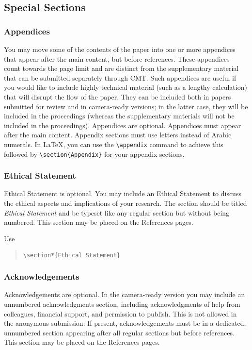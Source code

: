 \documentclass{article}
\begin{document}
\subsection{Special Sections}

\subsubsection{Appendices}
You may move some of the contents of the paper into one or more appendices that appear after the main content, but before references. These appendices count towards the page limit and are distinct from the supplementary material that can be submitted separately through CMT. Such appendices are useful if you would like to include highly technical material (such as a lengthy calculation) that will disrupt the flow of the paper. They can be included both in papers submitted for review and in camera-ready versions; in the latter case, they will be included in the proceedings (whereas the supplementary materials will not be included in the proceedings).
Appendices are optional. Appendices must appear after the main content.
Appendix sections must use letters instead of Arabic numerals. In \LaTeX, you can use the {\tt \textbackslash{}appendix} command to achieve this followed by  {\tt \textbackslash section\{Appendix\}} for your appendix sections.

\subsubsection{Ethical Statement}

Ethical Statement is optional. You may include an Ethical Statement to discuss  the ethical aspects and implications of your research. The section should be titled \emph{Ethical Statement} and be typeset like any regular section but without being numbered. This section may be placed on the References pages.

Use
\begin{quote}
    {\tt \textbackslash{}section*\{Ethical Statement\}}
\end{quote}

\subsubsection{Acknowledgements}

Acknowledgements are optional. In the camera-ready version you may include an unnumbered acknowledgments section, including acknowledgments of help from colleagues, financial support, and permission to publish. This is not allowed in the anonymous submission. If present, acknowledgements must be in a dedicated, unnumbered section appearing after all regular sections but before references.  This section may be placed on the References pages.
\end{document}
